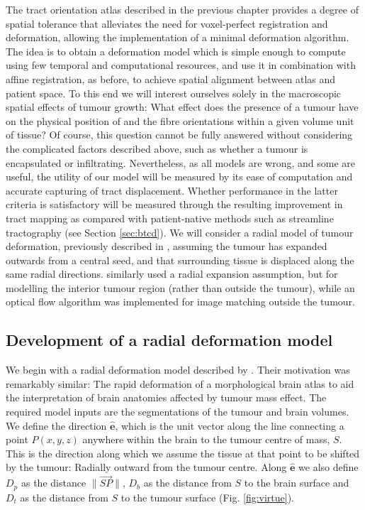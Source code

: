 The tract orientation atlas described in the previous chapter provides a degree of spatial tolerance that alleviates the need for voxel-perfect registration and deformation, allowing the implementation of a minimal deformation algorithm.
The idea is to obtain a deformation model which is simple enough to compute using few temporal and computational resources, and use it in combination with affine registration, as before, to achieve spatial alignment between atlas and patient space.
To this end we will interest ourselves solely in the macroscopic spatial effects of tumour growth:
What effect does the presence of a tumour have on the physical position of and the fibre orientations within a given volume unit of tissue?
Of course, this question cannot be fully answered without considering the complicated factors described above, such as whether a tumour is encapsulated or infiltrating.
Nevertheless, as all models are wrong, and some are useful, the utility of our model will be measured by its ease of computation and accurate capturing of tract displacement.
Whether performance in the latter criteria is satisfactory will be measured through the resulting improvement in tract mapping as compared with patient-native methods such as streamline tractography (see Section \ref{sec:btcd}).
We will consider a radial model of tumour deformation, previously described in \textcite{Young2022}, assuming the tumour has expanded outwards from a central seed, and that surrounding tissue is displaced along the same radial directions.
\textcite{Cuadra2004} similarly used a radial expansion assumption, but for modelling the interior tumour region (rather than outside the tumour), while an optical flow algorithm was implemented for image matching outside the tumour.


\subsection{Development of a radial deformation model}

We begin with a radial deformation model described by \textcite{Nowinski2005}.
Their motivation was remarkably similar:
The rapid deformation of a morphological brain atlas to aid the interpretation of brain anatomies affected by tumour mass effect.
The required model inputs are the segmentations of the tumour and brain volumes.
We define the direction $\mathbf{\hat{e}}$, which is the unit vector along the line connecting a point $P(x,y,z)$ anywhere within the brain to the tumour centre of mass, $S$.
This is the direction along which we assume the tissue at that point to be shifted by the tumour:
Radially outward from the tumour centre.
Along $\mathbf{\hat{e}}$ we also define $D_p$ as the distance  $\|\overrightarrow{SP}\|$, $D_b$ as the distance from $S$ to the brain surface and $D_t$ as the distance from $S$ to the tumour surface (Fig. \ref{fig:virtue}).

